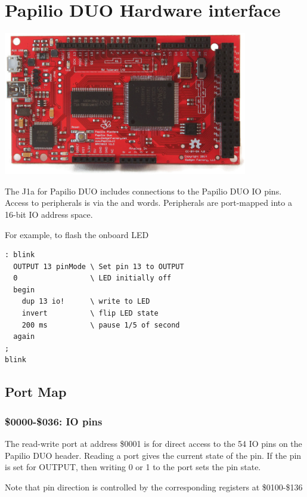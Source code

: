 \chapter{Papilio DUO Hardware interface}

\begin{center}
\includegraphics[width=0.8\textwidth]{PapilioDUO.png}
\end{center}

The J1a for Papilio DUO includes connections to the Papilio DUO IO pins.
Access to peripherals is via the
 and  words.
Peripherals are port-mapped into a 16-bit IO address space.

\newpage
For example, to flash the onboard LED

\begin{framed}
\begin{Verbatim}
: blink
  OUTPUT 13 pinMode \ Set pin 13 to OUTPUT
  0                 \ LED initially off
  begin
    dup 13 io!      \ write to LED
    invert          \ flip LED state
    200 ms          \ pause 1/5 of second
  again
;
blink
\end{Verbatim}
\end{framed}

\newpage
\section{Port Map}
\subsection{\$0000-\$036: IO pins}

The read-write port at address \$0001 is for direct access to the 54 IO pins
on the Papilio DUO header.
Reading a port gives the current state of the pin.
If the pin is set for OUTPUT,
then writing 0 or 1 to the port sets the pin state.

Note that pin direction is controlled by the corresponding registers at \$0100-\$136

